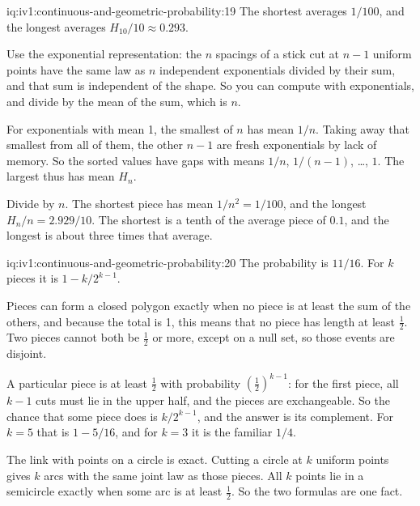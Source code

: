 \begin{solution}{iq:iv1:continuous-and-geometric-probability:19}
The shortest averages $1/100$, and the longest averages $H_{10}/10 \approx 0.293$.

Use the exponential representation: the $n$ spacings of a stick cut at $n - 1$ uniform points have the same law as $n$ independent exponentials divided by their sum, and that sum is independent of the shape. So you can compute with exponentials, and divide by the mean of the sum, which is $n$.

For exponentials with mean 1, the smallest of $n$ has mean $1/n$. Taking away that smallest from all of them, the other $n - 1$ are fresh exponentials by lack of memory. So the sorted values have gaps with means $1/n$, $1/(n-1)$, \dots, $1$. The largest thus has mean $H_n$.

Divide by $n$. The shortest piece has mean $1/n^2 = 1/100$, and the longest $H_n/n = 2.929/10$. The shortest is a tenth of the average piece of $0.1$, and the longest is about three times that average.

\end{solution}

\begin{solution}{iq:iv1:continuous-and-geometric-probability:20}
The probability is $11/16$. For $k$ pieces it is $1 - k/2^{k - 1}$.

Pieces can form a closed polygon exactly when no piece is at least the sum of the others, and because the total is 1, this means that no piece has length at least $\tfrac12$. Two pieces cannot both be $\tfrac12$ or more, except on a null set, so those events are disjoint.

A particular piece is at least $\tfrac12$ with probability $(\tfrac12)^{k - 1}$: for the first piece, all $k - 1$ cuts must lie in the upper half, and the pieces are exchangeable. So the chance that some piece does is $k/2^{k - 1}$, and the answer is its complement. For $k = 5$ that is $1 - 5/16$, and for $k = 3$ it is the familiar $1/4$.

The link with points on a circle is exact. Cutting a circle at $k$ uniform points gives $k$ arcs with the same joint law as those pieces. All $k$ points lie in a semicircle exactly when some arc is at least $\tfrac12$. So the two formulas are one fact.

\end{solution}

